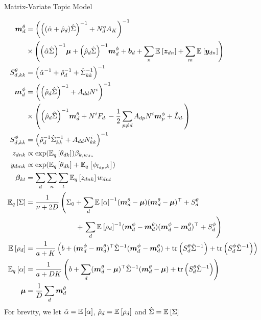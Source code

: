\begin{algorithm}
\caption{Matrix-Variate Topic Model}
\label{alg:sra_generic}

    \begin{align*}
        \mtd &= 
            \invb{ \invb{(\hat{\alpha} + \hat{\rho}_d)\hat{\Sigma}} + N^o_d A_K } \\
            & \times \left(
                \invb{\hat{\alpha} \hat{\Sigma}}\vv{\mu}
                + \invb{\hat{\rho}_d \hat{\Sigma}} \mpd + \vv{b}_d 
                + \sum_n \ex{\vv{z}_{dn}}{} 
                + \sum_m \ex{\vv{y}_{dn}}{}
            \right)\\
         S^\theta_{d,kk} &= \invb{\inv{\hat{\alpha}} + \inv{\hat{\rho}_d} + \inv{\hat{\Sigma}}_{kk}} \\
         \mpd & = \invb{\invb{\hat{\rho}_d \hat{\Sigma}} + A_{dd}N^i} \\
             & \times \left(
                 \invb{\hat{\rho}_d \hat{\Sigma}}\mtd 
                 + N^i F_{d\cdot} 
                 -\half \sum_{p \neq d} A_{dp} N^i \vv{m}^\phi_p 
                 + \hat{L}_{d\cdot}
             \right) \\
        S^\phi_{d,kk} & = \invb{ \inv{\hat{\rho}_d} \inv{\hat{\Sigma}_{kk}} + A_{dd}N^i_{kk} } \\
        z_{dnk} & \propto \exp(\ex{\theta_{dk}}{q})\beta_{k,w_{dn}} \\
        y_{dmk} & \propto \exp(\ex{\theta_{dk}}{q} + \ex{\phi_{l_{dp},k}}{q}) \\
        \vv{\beta}_{kt} & = \sum_d \sum_n \sum_t \ex{z_{dnk}}{q} w_{dnt} \\
        \ex{\Sigma}{q} & =  \oneover{\nu + 2D} \left(\Sigma_0
             + \sum_d \inv{\ex{\alpha}{}} (\mtd - \vv{\mu})(\mtd - \vv{\mu})\T + \std  \right .\\
            & \qquad\qquad\qquad\quad+ \left. \sum_d \inv{\ex{\rho_d}{}} (\mpd - \mtd)(\mpd - \mtd)\T + \spd \right)  \\  \ex{\rho_d}{} & = \oneover{a + K} \left(b + (\mpd - \mtd)\T \inv{\hat{\Sigma}} (\mpd - \mtd) + \Tr{\std \inv{\hat{\Sigma}}} + \Tr{\spd \inv{\hat{\Sigma}}} \right) \\
        \ex{\alpha}{q} & = \oneover{a + DK} \left(b + \sum_d (\mtd - \vv{\mu})\T\inv{\hat{\Sigma}}(\mtd - \vv{\mu}) + \Tr{\std \inv{\hat{\Sigma}}} \right) \\
        \vv{\mu} &= \oneover{D} \sum_d \mtd
    \end{align*}
    For brevity, we let $\hat{\alpha} = \ex{\alpha}{}$, $\hat{\rho}_d = \ex{\rho_d}{}$ and $\hat{\Sigma} = \ex{\Sigma}{}$
\end{algorithm}

